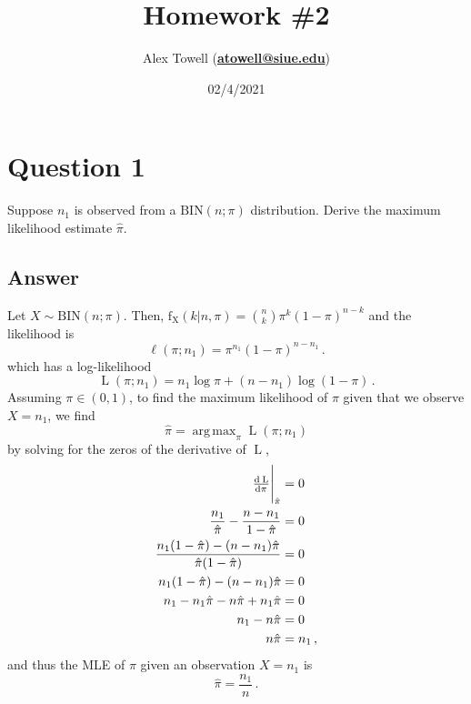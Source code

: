 \documentclass[10pt]{fphw}
\title{Homework \#2} %
\author{Alex Towell (\href{mailto:atowell@siue.edu}{\bfseries{atowell@siue.edu}})}
\date{02/4/2021} %
\institute{Southern Illinois University-Edwardsville}
\DeclareMathOperator*{\argmax}{arg\,max}
\begin{document}
\maketitle %

\section*{Question 1}
\begin{problem}
Suppose $n_1$ is observed from a $\mathrm{BIN}(n;\pi)$ distribution.
Derive the maximum likelihood estimate $\hat\pi$.
\end{problem}

\subsection*{Answer}
Let $X \sim \mathrm{BIN}(n;\pi)$. Then, $\operatorname{f_X}(k|n,\pi) = {n \choose k} \pi^k (1-\pi)^{n-k}$ and the likelihood is
\begin{equation*}
    \ell(\pi ; n_1) = \pi^{n_1} (1-\pi)^{n - n_1}\,.
\end{equation*}
which has a log-likelihood
\begin{equation}
    \operatorname{L}(\pi ; n_1) = n_1 \log \pi + (n - n_1) \log(1-\pi)\,.
\end{equation}
Assuming $\pi \in (0,1)$, to find the maximum likelihood of $\pi$ given that we observe $X = n_1$, we find
\begin{equation*}
    \hat\pi = \argmax_{\pi} \operatorname{L}(\pi ; n_1)
\end{equation*}
by solving for the zeros of the derivative of $\operatorname{L}$,
\begin{align*}
    \eval{\od{\operatorname{L}}{\pi}}_{\hat\pi} &= 0\\
    \frac{n_1}{\hat\pi} - \frac{n-n_1}{1-\hat\pi} &= 0\\
    \frac{n_1 (1-\hat\pi) - (n-n_1) \hat\pi}{\hat\pi (1-\hat\pi)} &= 0\\
    n_1 (1-\hat\pi) - (n-n_1) \hat\pi &= 0\\ 
    n_1 - n_1 \hat\pi - n \hat\pi + n_1 \hat\pi &= 0\\
    n_1 - n \hat\pi &= 0\\
    n \hat\pi &= n_1\,,
\end{align*}
and thus the MLE of $\pi$ given an observation $X = n_1$ is
\begin{equation}
    \hat\pi = \frac{n_1}{n}\,.
\end{equation}
\end{document}
